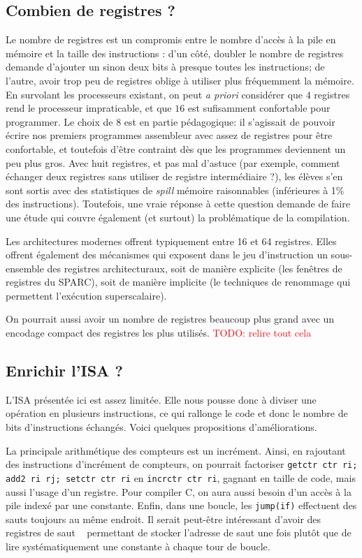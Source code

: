 \documentclass[architecture]{compas2018}
\newcommand{\todo}[1]{\textcolor{red}{TODO: #1}}
\begin{document}
\subsection{Combien de registres ?}
Le nombre de registres est un compromis entre le nombre d'accès à la pile en mémoire et la taille des instructions :
d'un côté, doubler le nombre de registres demande d'ajouter un sinon deux bits à presque toutes les instructions;
de l'autre, avoir trop peu de registres oblige à utiliser plus fréquemment la mémoire.
En survolant les processeurs existant, on peut {\it a priori} considérer que $4$ registres rend le processeur impraticable, et que $16$ est sufisamment confortable pour programmer.
Le choix de 8 est en partie pédagogique: il s'agissait de pouvoir écrire nos premiers programmes assembleur avec assez de registres pour être confortable, et toutefois d'être contraint dès que les programmes deviennent un peu plus gros. 
Avec huit registres, et pas mal d'astuce (par exemple, comment échanger deux registres sans utiliser de registre intermédiaire ?), les élèves s'en sont sortis avec des statistiques de \emph{spill} mémoire raisonnables (inférieures à 1\% des instructions).
Toutefois, une vraie réponse à cette question demande de faire une étude qui couvre également (et surtout) la problématique de la compilation.

Les architectures modernes offrent typiquement entre 16 et 64 registres.
Elles offrent également des mécanismes qui exposent dans le jeu d'instruction un sous-ensemble des registres architecturaux, soit de manière explicite (les fenêtres de registres du SPARC), soit de manière implicite (le techniques de renommage qui permettent l'exécution superscalaire).

On pourrait aussi avoir un nombre de registres beaucoup plus grand avec un encodage compact des registres les plus utilisés.
\todo{relire tout cela}

\subsection{Enrichir l'ISA ?}

L'ISA présentée ici est assez limitée. Elle nous pousse donc à diviser une opération en plusieurs instructions, ce qui rallonge le code et donc le nombre de bits d'instructions échangés. Voici quelques propositions d'améliorations.\par
La principale arithmétique des compteurs est un incrément. Ainsi, en rajoutant des instructions d'incrément de compteurs, on pourrait factoriser \texttt{getctr ctr ri; add2 ri rj; setctr ctr ri} en \texttt{incrctr ctr ri}, gagnant en taille de code, mais aussi l'usage d'un registre. Pour compiler C, on aura aussi besoin d'un accès à la pile indexé par une constante. Enfin, dans une boucle, les \texttt{jump(if)} effectuent des sauts toujours au même endroit. Il serait peut-être intéressant d'avoir des registres \og{} de saut \ \fg{} permettant de stocker l'adresse de saut une fois plutôt que de lire systématiquement une constante à chaque tour de boucle.  
\fi
\end{document}
